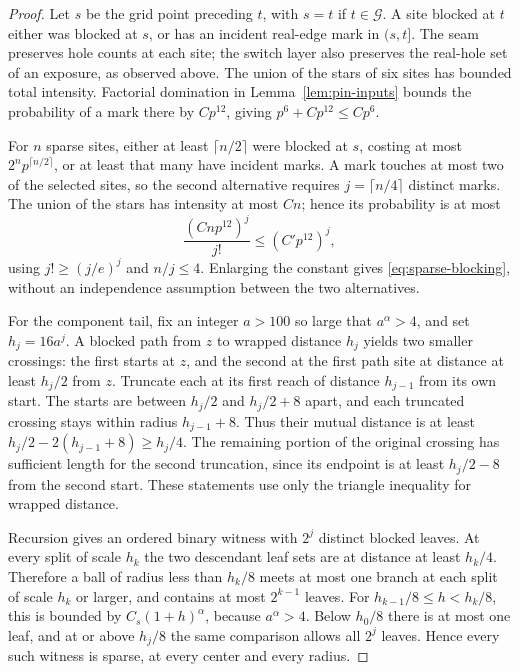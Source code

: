 \begin{proof}
Let \(s\) be the grid point preceding \(t\), with \(s=t\) if
\(t\in\mathcal G\).  A site blocked at \(t\) either was blocked at
\(s\), or has an incident real-edge mark in \((s,t]\).  The seam
preserves hole counts at each site; the switch layer also preserves
the real-hole set of an exposure, as observed above.  The union of
the stars of six sites has bounded total intensity.  Factorial
domination in Lemma~\ref{lem:pin-inputs} bounds the probability of a
mark there by \(Cp^{12}\), giving \(p^6+Cp^{12}\le Cp^6\).

For \(n\) sparse sites, either at least \(\lceil n/2\rceil\)
were blocked at \(s\), costing at most
\(2^np^{\lceil n/2\rceil}\), or at least that many have incident
marks.  A mark touches at most two of the selected sites, so the
second alternative requires \(j=\lceil n/4\rceil\) distinct marks.
The union of the stars has intensity at most \(Cn\); hence its
probability is at most
\[
 \frac{(Cnp^{12})^j}{j!}\le(C'p^{12})^j,
\]
using \(j!\ge(j/e)^j\) and \(n/j\le4\).  Enlarging the constant
gives \eqref{eq:sparse-blocking}, without an independence assumption
between the two alternatives.

For the component tail, fix an integer \(a>100\) so large that
\(a^\alpha>4\), and set \(h_j=16a^j\).  A blocked path from
\(z\) to wrapped distance \(h_j\) yields two smaller crossings:
the first starts at \(z\), and the second at the first path site at
distance at least \(h_j/2\) from \(z\).  Truncate each at its
first reach of distance \(h_{j-1}\) from its own start.  The starts
are between \(h_j/2\) and \(h_j/2+8\) apart, and each truncated
crossing stays within radius \(h_{j-1}+8\).  Thus their mutual
distance is at least
\(h_j/2-2(h_{j-1}+8)\ge h_j/4\).  The remaining portion of the
original crossing has sufficient length for the second truncation,
since its endpoint is at least \(h_j/2-8\) from the second start.
These statements use only the triangle inequality for wrapped distance.

Recursion gives an ordered binary witness with \(2^j\) distinct
blocked leaves.  At every split of scale \(h_k\) the two descendant
leaf sets are at distance at least \(h_k/4\).  Therefore a ball of
radius less than \(h_k/8\) meets at most one branch at each split
of scale \(h_k\) or larger, and contains at most \(2^{k-1}\)
leaves.  For \(h_{k-1}/8\le h<h_k/8\), this is bounded by
\(C_s(1+h)^\alpha\), because \(a^\alpha>4\).  Below \(h_0/8\)
there is at most one leaf, and at or above \(h_j/8\) the same
comparison allows all \(2^j\) leaves.  Hence every such witness
is sparse, at every center and every radius.


\end{proof}
